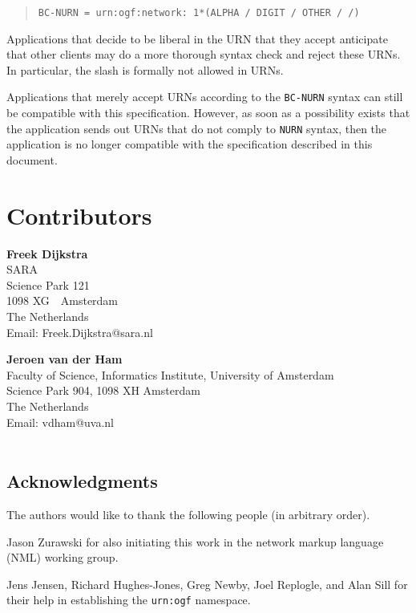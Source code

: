 \documentclass[12pt]{article}  %
\begin{document}
\begin{quote}
  \texttt{BC-NURN = \qq{}urn:ogf:network:\qq{} 1*(ALPHA / DIGIT / OTHER / \qq{}/\qq{})}
\end{quote}

Applications that decide to be liberal in the URN that they accept \MUST{} anticipate that other clients may do a more thorough syntax check and reject these URNs. In particular, the slash is formally not allowed in URNs.

Applications that merely accept URNs according to the \texttt{BC-NURN} syntax can still be compatible with this specification. 
However, as soon as a possibility exists that the application sends out URNs that do not comply to \texttt{NURN} syntax, 
then the application is no longer compatible with the specification described in this document.

\section{Contributors}

\textbf{Freek Dijkstra} \\
SARA \\
Science Park 121 \\
1098 XG\ \  Amsterdam \\
The Netherlands \\
Email: Freek.Dijkstra@sara.nl

\textbf{Jeroen van der Ham} \\
Faculty of Science, Informatics Institute, University of Amsterdam \\
Science Park 904, 1098 XH  Amsterdam  \\
The Netherlands \\
Email: vdham@uva.nl \\
\\

\subsection*{Acknowledgments}

The authors would like to thank the following people (in arbitrary order).

Jason Zurawski for also initiating this work in the network markup language (NML) working group.

Jens Jensen, Richard Hughes-Jones, Greg Newby, Joel Replogle, and Alan Sill for their help in establishing the \texttt{urn:ogf} namespace.
\end{document}
